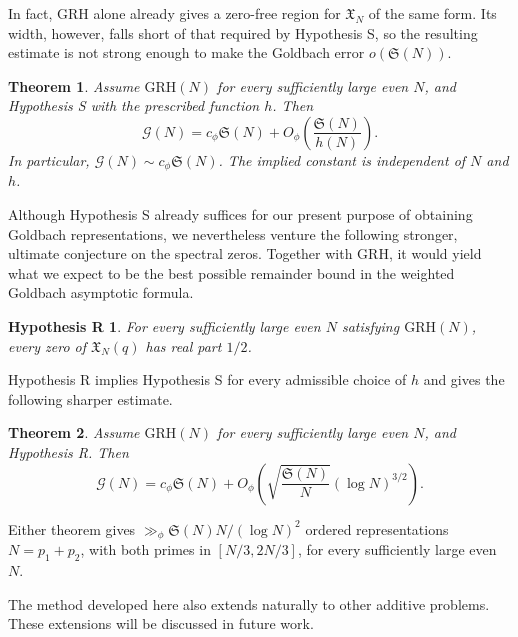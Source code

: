 \documentclass[12pt,a4paper]{amsart}
\numberwithin{equation}{section}
\theoremstyle{plain}
\newtheorem{theorem}{Theorem}[section]
\newtheorem*{hypothesisR}{Hypothesis R}
\theoremstyle{definition}
\theoremstyle{remark}
\begin{document}
In fact, GRH alone already gives a zero-free region for $\mathfrak X_N$
of the same form. Its width, however, falls short of that required by
Hypothesis S, so the resulting estimate is not strong enough to make
the Goldbach error $o(\mathfrak S(N))$.

\begin{theorem}\label{thm:goldbach-S}
Assume $\mathrm{GRH}(N)$ for every sufficiently large even
$N$, and Hypothesis S with the prescribed function $h$. Then
\begin{equation}\label{v3i:weak-result}
 \mathcal G(N)=c_\phi\mathfrak S(N)+
 O_\phi\!\left(\frac{\mathfrak S(N)}{h(N)}\right).
\end{equation}
In particular, $\mathcal G(N)\sim c_\phi\mathfrak S(N)$.
The implied constant is independent of $N$ and $h$.
\end{theorem}

Although Hypothesis S already suffices for our present purpose
of obtaining Goldbach representations, we nevertheless venture
the following stronger, ultimate conjecture on the spectral zeros.
Together with GRH, it would yield what we expect to be the best
possible remainder bound in the weighted Goldbach asymptotic formula.

\begin{hypothesisR}
For every sufficiently large even $N$ satisfying
$\mathrm{GRH}(N)$, every zero of $\mathfrak X_N(q)$ has
real part $1/2$.
\end{hypothesisR}

Hypothesis R implies Hypothesis S for every admissible choice
of $h$ and gives the following sharper estimate.

\begin{theorem}\label{thm:goldbach-R}
Assume $\mathrm{GRH}(N)$ for every sufficiently large even
$N$, and Hypothesis R. Then
\begin{equation}\label{v3i:strong-result}
 \mathcal G(N)=c_\phi\mathfrak S(N)+
 O_\phi\!\left(
       \sqrt{\frac{\mathfrak S(N)}N}(\log N)^{3/2}\right).
\end{equation}
\end{theorem}

Either theorem gives
$\gg_\phi\mathfrak S(N)N/(\log N)^2$ ordered representations
$N=p_1+p_2$, with both primes in $[N/3,2N/3]$, for every
sufficiently large even $N$.

The method developed here also extends naturally to other additive
problems. These extensions will be discussed in future work.
\end{document}
